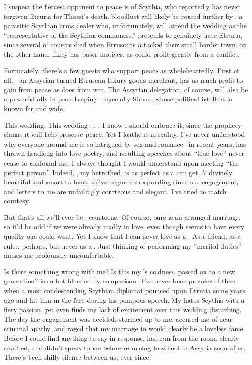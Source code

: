 \documentclass[char]{Kos}
\begin{document}
I suspect the fiercest opponent to peace is \cScythiaQueen{\Monarch} \cScythiaQueen{} of Scythia, who reportedly has never forgiven Etruria for Thoesi's death. \cScythiaQueen{\Their} bloodlust will likely be roused further by \cArmsDealer{}, a parasitic Scythian arms dealer who, unfortunately, will attend the wedding as the ``representative of the Scythian commoners.'' \cArmsDealer{\They} pretends to genuinely hate Etruria, since several of \cArmsDealer{\their} cousins died when Etruscans attacked their small border town; on the other hand, \cArmsDealer{\they} likely has baser motives, as \cArmsDealer{\they} could profit greatly from a conflict. 

Fortunately, there's a few guests who support peace as wholeheartedly. First of all, \cMerchant{}, an Assyrian-turned-Etruscan luxury goods merchant, has as much profit to gain from peace as \cArmsDealer{} does from war. The Assyrian delegation, of course, will also be a powerful ally in peacekeeping-- especially Sirasu, whose political intellect is known far and wide.

This wedding. This wedding . . . I know I should embrace it, since the prophecy claims it will help preserve peace. Yet I loathe it in reality. I've never understood why everyone around me is so intrigued by sex and romance-- in recent years, \cPoet{} has thrown \cPoet{\themself} headlong into love poetry, and \cPoet{\their} resulting speeches about ``true love'' never cease to confound me. I always thought I would understand upon meeting ``the perfect person.'' Indeed, \cBride{}, my betrothed, is as perfect as a \cBride{\human} can get. \cBride{\They}'s divinely beautiful and smart to boot; we've begun corresponding since our engagement, and \cBride{\their} letters to me are unfailingly courteous and elegant. I've tried to match \cBride{\their} courtesy. 

But that's all we'll ever be-- courteous. Of course, ours is an arranged marriage, so it'd be odd if we were already madly in love, even though \cBride{\they} seems to have every quality one could want. Yet I know that I can never love \cBride{\them} as a \cBride{\spouse}. As a friend, as a ruler, perhaps, but never as a \cBride{\spouse}. Just thinking of performing my ''marital duties'' makes me profoundly uncomfortable.

Is there something wrong with me? Is this my \cEtruriaKing{\parent}'s coldness, passed on to a new generation? \cPoet{} is so hot-blooded by comparison-- I've never been prouder of \cPoet{\them} than when a most condescending Scythian diplomat pounced upon Etruria some years ago and \cPoet{\they} hit him in the face during his pompous speech. My \cPoet{\sibling} hates Scythia with a fiery passion, yet even \cPoet{\they} finds my lack of excitement over this wedding disturbing. The day the engagement was decided, \cPoet{\they} stormed up to me, accused me of near-criminal apathy, and raged that my marriage to \cBride{} would clearly be a loveless farce. Before I could find anything to say in response, \cPoet{} had run from the room, clearly revolted, and \cPoet{\they} didn't speak to me before returning to school in Assyria soon after. There's been chilly silence between us, ever since.
\end{document}
